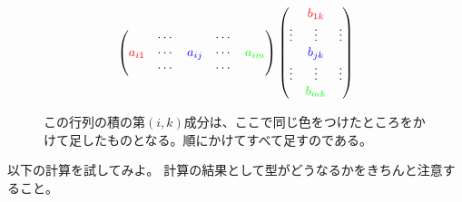 \documentclass[10pt]{jsreport}
\theoremstyle{definition}%
\numberwithin{equation}{section}%
\begin{document}
\begin{figure}[H]
  
\begin{equation}
  \left( 
   \begin{matrix}
            & \cdots &    & \cdots & \\
          \textcolor{red}{a_{i1}} & \cdots & \textcolor{blue}{a_{ij}}   & \cdots &  \textcolor{green}{a_{im}}  \\
            & \cdots &     & \cdots & 
   \end{matrix}
 \right)    \left( 
  \begin{matrix}
           & \textcolor{red}{b_{1k}} & \\
    \vdots & \vdots & \vdots\\
           & \textcolor{blue}{b_{jk}} & \\
    \vdots & \vdots & \vdots \\
           & \textcolor{green}{b_{mk}} & 
  \end{matrix}
\right)
\end{equation}
  \caption{この行列の積の第$(i,k)$成分は、ここで同じ色をつけたところをかけて足したものとなる。順にかけてすべて足すのである。}
\end{figure}
以下の計算を試してみよ。
計算の結果として型がどうなるかをきちんと注意すること。
\end{document}

